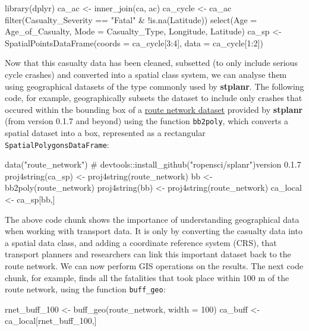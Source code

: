 \begin{Schunk}
\begin{Sinput}
library(dplyr)
ca_ac <- inner_join(ca, ac)
ca_cycle <- ca_ac %
  filter(Casualty_Severity == "Fatal" & !is.na(Latitude)) %
  select(Age = Age_of_Casualty, Mode = Casualty_Type, Longitude, Latitude)
ca_sp <- SpatialPointsDataFrame(coords = ca_cycle[3:4], data = ca_cycle[1:2])
\end{Sinput}
\end{Schunk}

Now that this casualty data has been cleaned, subsetted (to only include
serious cycle crashes) and converted into a spatial class system, we can
analyse them using geographical datasets of the type commonly used by
\textbf{stplanr}. The following code, for example, geographically
subsets the dataset to include only crashes that occured within the
bounding box of a
\href{https://github.com/ropensci/stplanr/blob/master/data/route_network.rda?raw=true}{route
network dataset} provided by \textbf{stplanr} (from version 0.1.7 and
beyond) using the function \texttt{bb2poly}, which converts a spatial
dataset into a box, represented as a rectangular
\texttt{SpatialPolygonsDataFrame}:

\begin{Schunk}
\begin{Sinput}
data("route_network") # devtools::install_github("ropensci/splanr")version 0.1.7
proj4string(ca_sp) <- proj4string(route_network)
bb <- bb2poly(route_network)
proj4string(bb) <- proj4string(route_network)
ca_local <- ca_sp[bb,]
\end{Sinput}
\end{Schunk}

The above code chunk shows the importance of understanding geographical
data when working with transport data. It is only by converting the
casualty data into a spatial data class, and adding a coordinate
reference system (CRS), that transport planners and researchers can link
this important dataset back to the route network. We can now perform GIS
operations on the results. The next code chunk, for example, finds all
the fatalities that took place within 100 m of the route network, using
the function \texttt{buff\_geo}:

\begin{Schunk}
\begin{Sinput}
rnet_buff_100 <- buff_geo(route_network, width = 100)
ca_buff <- ca_local[rnet_buff_100,]
\end{Sinput}
\end{Schunk}

